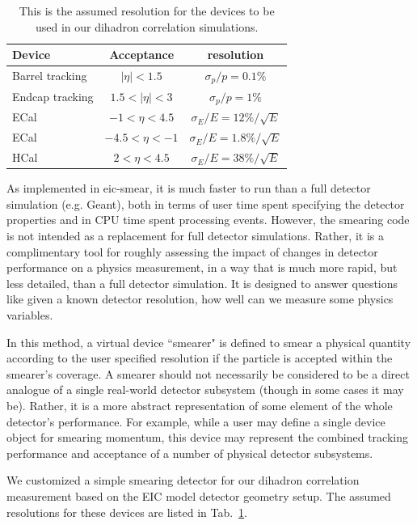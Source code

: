 \begin{table} 
\centering 
\caption[Assumed resolutions for fast smearing setup]{This is the
assumed resolution for the devices to be used in our dihadron correlation simulations.}
\label{tab:EIC_smear} 
\begin{tabular}{| l | c | c | } \hline
Device	& Acceptance & resolution \\ \hline
Barrel tracking  	&  $|\eta|<1.5$  &  $\sigma_{p}/p=0.1\%$   \\  
Endcap tracking    &  $1.5<|\eta|<3$  &   $\sigma_{p}/p=1\%$   \\  
ECal   & $-1<\eta<4.5$  &  $\sigma_{E}/E=12\%/\sqrt{E}$   \\  
ECal  & $-4.5<\eta<-1$ & $\sigma_{E}/E=1.8\%/\sqrt{E}$   \\ 
HCal  & $2<\eta<4.5$ & $\sigma_{E}/E=38\%/\sqrt{E}$   \\ \hline
\end{tabular} 
\end{table}


As implemented in eic-smear, it is much faster to run than a full detector
simulation (e.g. Geant), both in terms of user time spent specifying the
detector properties and in CPU time spent processing events. However,  the
smearing code is not intended as a replacement for full detector simulations.
Rather, it is a complimentary tool for roughly assessing the impact of changes
in detector performance on a physics measurement, in a way that is much more
rapid, but less detailed, than a full detector simulation. It is designed to
answer questions like given a known detector resolution, how well can we
measure some physics variables. 

In this method, a virtual device ``smearer" is defined to smear a physical
quantity according to the user specified resolution if the particle is accepted
within the smearer's coverage. A smearer should not necessarily be considered to
be a direct analogue of a single real-world detector subsystem (though in some
cases it may be). Rather, it is a more abstract representation of some element
of the whole detector's performance. For example, while a user may define a
single device object for smearing momentum, this device may represent the
combined tracking performance and acceptance of a number of physical detector
subsystems.

We customized a simple smearing detector for our dihadron correlation
measurement based on the EIC model detector geometry setup. The assumed
resolutions for these devices are listed in Tab.~\ref{tab:EIC_smear}.





